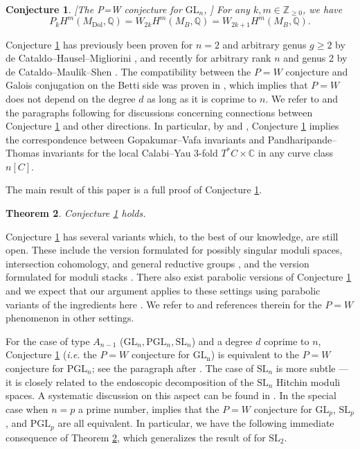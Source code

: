 \documentclass[11pt]{amsart}
\theoremstyle{plain}
\newtheorem{thm}{Theorem}[section]
\newtheorem{conj}[thm]{Conjecture}
\theoremstyle{definition}
\theoremstyle{remark}
\newcommand{\BC}{{\mathbb{C}}}
\newcommand{\BQ}{{\mathbb{Q}}}
\newcommand{\BZ}{{\mathbb{Z}}}
\begin{document}
\begin{conj}\label{conj}[The P=W conjecture for $\mathrm{GL}_n$, \cite{dCHM1}] For any $k,m\in \BZ_{\geq 0}$, we have
\[
P_kH^m(M_{\mathrm{Dol}}, \BQ) = W_{2k}H^m(M_{B}, \BQ) = W_{2k+1}H^m(M_B, \BQ).
\]
\end{conj}

Conjecture \ref{conj} has previously been proven for $n=2$ and arbitrary genus $g\geq 2$ by de Cataldo--Hausel--Migliorini \cite{dCHM1}, and recently for arbitrary rank $n$ and genus 2 by de Cataldo--Maulik--Shen \cite{dCMS}. The compatibility between the $P=W$ conjecture and Galois conjugation on the Betti side was proven in \cite{dCMSZ}, which implies that $P=W$ does not depend on the degree $d$ as long as it is coprime to $n$. We refer to \cite[Section 1]{dCHM1} and the paragraphs following \cite[Theorem 0.2]{dCMS} for discussions concerning connections between Conjecture \ref{conj} and other directions. In particular, by \cite{CDP} and \cite[Section 9.3]{MT}, Conjecture \ref{conj} implies the correspondence between Gopakumar--Vafa invariants and Pandharipande--Thomas invariants \cite[Conjecture 3.13]{MT} for the local Calabi--Yau 3-fold $T^*C \times \BC$ in any curve class $n[C]$. 


The main result of this paper is a full proof of Conjecture \ref{conj}.

\begin{thm}\label{thm}
    Conjecture \ref{conj} holds.
\end{thm}


Conjecture \ref{conj} has several variants which, to the best of our knowledge, are still open. These include the version formulated for possibly singular moduli spaces, intersection cohomology, and general reductive groups \cite{dCHM1, dCM, FM}, and the version formulated for moduli stacks \cite{Davison}.  There also exist parabolic versions of Conjecture \ref{conj} and we expect that our argument applies to these settings using parabolic variants of the ingredients here \cite{Mellit, OY}. We refer to \cite{DMS, HLSY, Geo_P=W, Zhang} and references therein for the $P=W$ phenomenon in other settings.


For the case of type $A_{n-1}$ ($\mathrm{GL}_n, \mathrm{PGL}_n, \mathrm{SL}_n$) and a degree $d$ coprime to $n$, Conjecture \ref{conj} (\emph{i.e.} the $P=W$ conjecture for $\mathrm{GL_n}$) is equivalent to the $P=W$ conjecture for $\mathrm{PGL}_n$; see the paragraph after \cite[Theorem 0.2]{dCMS}. The case of $\mathrm{SL}_n$ is more subtle --- it is closely related to the endoscopic decomposition of the $\mathrm{SL}_n$ Hitchin moduli spaces. A systematic discussion on this aspect can be found in \cite[Section 5]{MS}. In the special case when $n=p$ a prime number, \cite[Theorem 0.2]{SLn} implies that the $P=W$ conjecture for $\mathrm{GL}_p$, $\mathrm{SL}_p$, and $\mathrm{PGL}_p$ are all equivalent. In particular, we have the following immediate consequence of Theorem \ref{thm}, which generalizes the result of \cite{dCHM1} for $\mathrm{SL}_2$.
\end{document}

